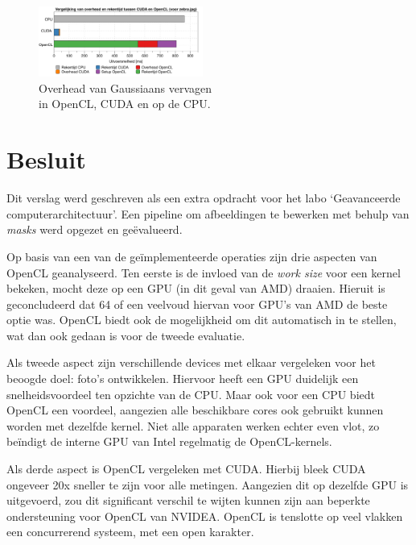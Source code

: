 \documentclass[twocolumn, a4paper]{article}
\begin{document}
\begin{figure}
    \centering
    \includegraphics[width=0.48\textwidth]{data/opencl-vs-cuda-overhead.png}
    \caption{Overhead van Gaussiaans vervagen \\in OpenCL, CUDA en op de CPU.}\label{fig:vs-overhead}
\end{figure}

\section{Besluit}
Dit verslag werd geschreven als een extra opdracht voor het labo `Geavanceerde computerarchitectuur'. Een pipeline om afbeeldingen te bewerken met behulp van \textit{masks} werd opgezet en ge\"evalueerd.

Op basis van een van de geïmplementeerde operaties zijn drie aspecten van OpenCL geanalyseerd. Ten eerste is de invloed van de \emph{work size} voor een kernel bekeken, mocht deze op een GPU (in dit geval van AMD) draaien. Hieruit is geconcludeerd dat 64 of een veelvoud hiervan voor GPU's van AMD de beste optie was. OpenCL biedt ook de mogelijkheid om dit automatisch in te stellen, wat dan ook gedaan is voor de tweede evaluatie.

Als tweede aspect zijn verschillende devices met elkaar vergeleken voor het beoogde doel: foto's ontwikkelen. Hiervoor heeft een GPU duidelijk een snelheidsvoordeel ten opzichte van de CPU. Maar ook voor een CPU biedt OpenCL een voordeel, aangezien alle beschikbare cores ook gebruikt kunnen worden met dezelfde kernel. Niet alle apparaten werken echter even vlot, zo beïndigt de interne GPU van Intel regelmatig de OpenCL-kernels. 

Als derde aspect is OpenCL vergeleken met CUDA. Hierbij bleek CUDA ongeveer 20x sneller te zijn voor alle metingen. Aangezien dit op dezelfde GPU is uitgevoerd, zou dit significant verschil te wijten kunnen zijn aan beperkte ondersteuning voor OpenCL van NVIDEA. OpenCL is tenslotte op veel vlakken een concurrerend systeem, met een open karakter. 
\end{document}

